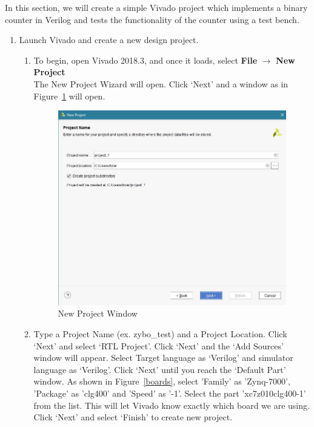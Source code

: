 \documentclass[11pt,twoside,titlepage]{article}
\begin{document}
\noindent
In this section, we will create a simple Vivado project which implements a binary counter in Verilog and tests the functionality of the counter using a test bench. 

\begin{enumerate}
	\item Launch Vivado and create a new design project.
	\begin{enumerate}
		\item To begin, open Vivado 2018.3, and once it loads, select \textbf{File} $\rightarrow$ \textbf{New Project} \\
		The New Project Wizard will open. Click `Next' and a window as in Figure~\ref{newproj} will open.  \\
		
		
		\begin{figure}[!h]
			\centering
			\includegraphics[width=.7\textwidth]{newproj}
			\caption{New Project Window}
			\label{newproj}
		\end{figure}
	
		\item Type a Project Name (ex. zybo\_test) and a Project Location. Click `Next' and select `RTL Project'. Click `Next'  and the `Add Sources' window will appear. Select Target language as `Verilog' and simulator language as `Verilog'. Click `Next' until you reach  the `Default Part' window. As shown in Figure~\ref{boards}, select 'Family' as 'Zynq-7000', 'Package' as 'clg400' and 'Speed' as '-1'. Select the part 'xc7z010clg400-1' from the list. This will let Vivado know exactly which board we are using. Click `Next' and select `Finish' to create new project.
		

\end{enumerate}
\end{enumerate}
\end{document}
